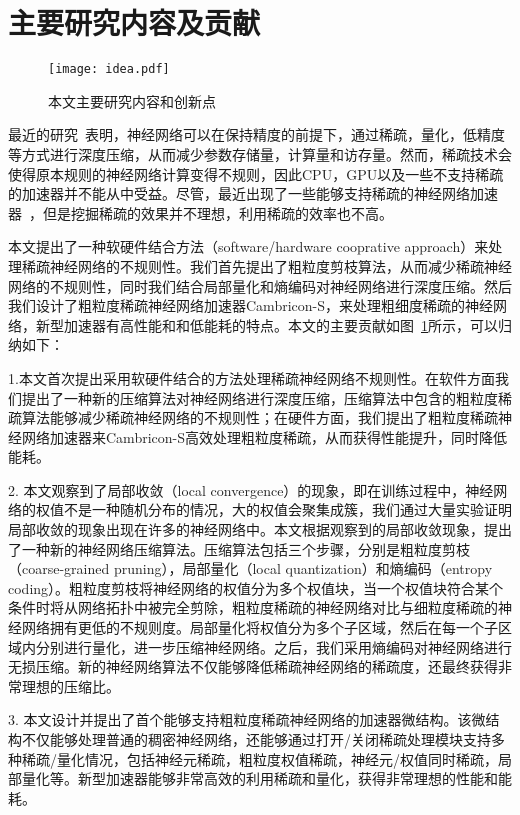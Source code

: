 \section{主要研究内容及贡献}

\begin{figure}[ht]
\centering
\texttt{[image: idea.pdf]}
\caption{本文主要研究内容和创新点}
\label{fig:idea}
\end{figure}


最近的研究~\cite{han2015learning,han2015deep,wang2016cnnpack,zhou2017incremental}表明，神经网络可以在保持精度的前提下，通过稀疏，量化，低精度等方式进行深度压缩，从而减少参数存储量，计算量和访存量。然而，稀疏技术会使得原本规则的神经网络计算变得不规则，因此CPU，GPU以及一些不支持稀疏的加速器并不能从中受益。尽管，最近出现了一些能够支持稀疏的神经网络加速器~\cite{chen2017eyeriss,zhang2016cambricon,albericio2016cnvlutin,han2016eie,han2017ese,angshuman2017scnn}，但是挖掘稀疏的效果并不理想，利用稀疏的效率也不高。

本文提出了一种软硬件结合方法（software/hardware cooprative approach）来处理稀疏神经网络的不规则性。我们首先提出了粗粒度剪枝算法，从而减少稀疏神经网络的不规则性，同时我们结合局部量化和熵编码对神经网络进行深度压缩。然后我们设计了粗粒度稀疏神经网络加速器Cambricon-S，来处理粗细度稀疏的神经网络，新型加速器有高性能和和低能耗的特点。本文的主要贡献如图~\ref{fig:idea}所示，可以归纳如下：

1.本文首次提出采用软硬件结合的方法处理稀疏神经网络不规则性。在软件方面我们提出了一种新的压缩算法对神经网络进行深度压缩，压缩算法中包含的粗粒度稀疏算法能够减少稀疏神经网络的不规则性；在硬件方面，我们提出了粗粒度稀疏神经网络加速器来Cambricon-S高效处理粗粒度稀疏，从而获得性能提升，同时降低能耗。

2. 本文观察到了局部收敛（local convergence）的现象，即在训练过程中，神经网络的权值不是一种随机分布的情况，大的权值会聚集成簇，我们通过大量实验证明局部收敛的现象出现在许多的神经网络中。本文根据观察到的局部收敛现象，提出了一种新的神经网络压缩算法。压缩算法包括三个步骤，分别是粗粒度剪枝（coarse-grained pruning），局部量化（local quantization）和熵编码（entropy coding）。粗粒度剪枝将神经网络的权值分为多个权值块，当一个权值块符合某个条件时将从网络拓扑中被完全剪除，粗粒度稀疏的神经网络对比与细粒度稀疏的神经网络拥有更低的不规则度。局部量化将权值分为多个子区域，然后在每一个子区域内分别进行量化，进一步压缩神经网络。之后，我们采用熵编码对神经网络进行无损压缩。新的神经网络算法不仅能够降低稀疏神经网络的稀疏度，还最终获得非常理想的压缩比。

3. 本文设计并提出了首个能够支持粗粒度稀疏神经网络的加速器微结构。该微结构不仅能够处理普通的稠密神经网络，还能够通过打开/关闭稀疏处理模块支持多种稀疏/量化情况，包括神经元稀疏，粗粒度权值稀疏，神经元/权值同时稀疏，局部量化等。新型加速器能够非常高效的利用稀疏和量化，获得非常理想的性能和能耗。

